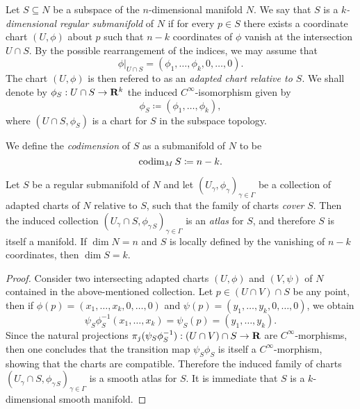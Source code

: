 \begin{definition}
\label{def:regular-submanifold}
Let \(S \subseteq N\) be a subspace of the \(n\)-dimensional manifold \(N\). We
say that \(S\) is a \emph{\(k\)-dimensional regular submanifold} of \(N\) if for
every \(p \in S\) there exists a coordinate chart \((U, \phi)\) about \(p\) such
that \(n-k\) coordinates of \(\phi\) vanish at the intersection \(U \cap S\). By
the possible rearrangement of the indices, we may assume that
\[
\phi|_{U \cap S} = (\phi_1, \dots, \phi_k, 0, \dots, 0).
\]
The chart \((U, \phi)\) is then refered to as an \emph{adapted chart relative to
  \(S\)}. We shall denote by \(\phi_S: U \cap S \to \mathbf{R}^k\) the induced
\(C^{\infty}\)-isomorphism given by
\[
\phi_S \coloneq (\phi_1, \dots, \phi_k),
\]
where \((U \cap S, \phi_S)\) is a chart for \(S\) in the subspace topology.

We define the \emph{codimension} of \(S\) as a submanifold of \(N\) to be
\[
\operatorname{codim}_M S \coloneq n - k.
\]
\end{definition}

\begin{proposition}
\label{prop:regular-submanifold}
Let \(S\) be a regular submanifold of \(N\) and let
\((U_{\gamma}, \phi_{\gamma})_{\gamma \in \Gamma}\) be a collection of adapted
charts of \(N\) relative to \(S\), such that the family of charts \emph{cover}
\(S\). Then the induced collection
\((U_{\gamma} \cap S, \phi_{\gamma\, S})_{\gamma \in \Gamma}\) is an
\emph{atlas} for \(S\), and therefore \(S\) is itself a manifold. If
\(\dim N = n\) and \(S\) is locally defined by the vanishing of \(n-k\)
coordinates, then \(\dim S = k\).
\end{proposition}

\begin{proof}
Consider two intersecting adapted charts \((U, \phi)\) and \((V, \psi)\) of
\(N\) contained in the above-mentioned collection. Let \(p \in (U \cap V) \cap
S\) be any point, then if \(\phi(p) = (x_1, \dots, x_k, 0, \dots, 0)\) and
\(\psi(p) = (y_1, \dots, y_k, 0, \dots, 0)\), we obtain
\[
\psi_S \phi_S^{-1}(x_1, \dots, x_k) = \psi_S(p) = (y_1, \dots, y_k).
\]
Since the natural projections
\(\pi_j(\psi_S \phi_S^{-1}): (U \cap V) \cap S \to \mathbf{R}\) are
\(C^{\infty}\)-morphisms, then one concludes that the transition map
\(\psi_S \phi_S\) is itself a \(C^{\infty}\)-morphism, showing that the charts
are compatible. Therefore the induced family of charts
\((U_{\gamma} \cap S, \phi_{\gamma\, S})_{\gamma \in \Gamma}\) is a smooth atlas
for \(S\). It is immediate that \(S\) is a \(k\)-dimensional smooth manifold.
\end{proof}


